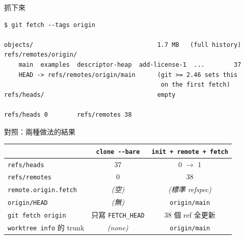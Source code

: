\begin{frame}[fragile]{抓下來}
\begin{lstlisting}
$ git fetch --tags origin

objects/                                  1.7 MB   (full history)
refs/remotes/origin/
    main  examples  descriptor-heap  add-license-1  ...        37
    HEAD -> refs/remotes/origin/main      (git >= 2.46 sets this
                                           on the first fetch)
refs/heads/                               empty

refs/heads 0        refs/remotes 38
\end{lstlisting}

\end{frame}

\begin{frame}{對照：兩種做法的結果}
\begin{center}\footnotesize
\begin{tabular}{lcc}
  \toprule
    & \texttt{clone -{}-bare} & \texttt{init + remote + fetch} \\
  \midrule
  \texttt{refs/heads}                 & 37                    & 0 $\rightarrow$ 1 \\
  \texttt{refs/remotes}               & 0                     & 38 \\
  \texttt{remote.origin.fetch}        & \emph{(空)}           & \emph{(標準 refspec)} \\
  \texttt{origin/HEAD}                & \emph{(無)}           & \texttt{origin/main} \\
  \texttt{git fetch origin}           & 只寫 \texttt{FETCH\_HEAD} & 38 個 ref 全更新 \\
  \texttt{worktree info} 的 trunk     & \emph{(none)}         & \texttt{origin/main} \\
  \bottomrule
\end{tabular}
\end{center}

\end{frame}

